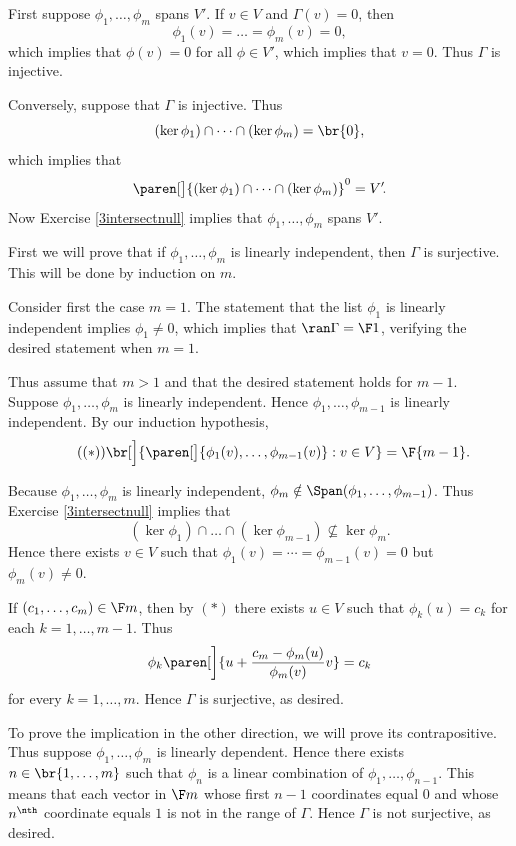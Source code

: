 \begin{Solution}
\begin{subtheorem}
\item
First suppose $\phi_1, \dots, \phi_m$ spans $V'\!$. If $v \in V$ and $\Gamma(v) = 0$, then
\[
\phi_1(v) = \dots = \phi_m(v) = 0,
\]
which implies that $\phi(v) = 0$ for all $\phi \in V'\!$, which implies that $v = 0$. Thus $\Gamma$ is injective.

Conversely, suppose that $\Gamma$ is injective. Thus
\[
(\ker \phi_1) \cap \cdots \cap (\ker \phi_m) = \br{0},
\]
which implies that
\[
\paren[\big]{ (\ker \phi_1) \cap \cdots \cap (\ker \phi_m) }^0 = V'\!.
\]
Now Exercise \ref{3intersectnull} implies that $\phi_1, \dots, \phi_m$ spans $V'\!$.

\item
First we will prove that if $\phi_1, \dots, \phi_m$ is linearly independent, then $\Gamma$ is surjective. This will be done by induction on $m$.

Consider first the case $m = 1$. The statement that the list $\phi_1$ is linearly independent implies $\phi_1 \ne 0$, which implies that $\ran \Gamma = \F1$, verifying the desired statement when $m = 1$.

Thus assume that $m>1$ and that the desired statement holds for $m-1$. Suppose $\phi_1, \dots, \phi_m$ is linearly independent. Hence $\phi_1, \dots, \phi_{m-1}$ is linearly independent. By our induction hypothesis,
\[ \tag{$(*)$}
\br[\Big]{ \paren[\big]{ \phi_1(v), \ldots, \phi_{m-1}(v) } : v \in V} = \F{m-1} .
\]

Because $\phi_1, \dots, \phi_m$ is linearly independent, $\phi_m \notin \Span(\phi_1, \ldots, \phi_{m-1})$. Thus Exercise \ref{3intersectnull} implies that
\[
(\ker \phi_1) \cap \dots \cap (\ker \phi_{m-1}) \nsubseteq \ker \phi_m.
\]
Hence there exists $v \in V$ such that $\phi_1(v) = \cdots = \phi_{m-1}(v) = 0$ but $\phi_m(v) \ne 0$.

If $(c_1, \ldots, c_m) \in \F m$, then by $(*)$ there exists $u \in V$ such that $\phi_k(u) = c_k$ for each $k = 1, \ldots, m-1$. Thus
\[
\phi_k\paren[\bigg]{u + \frac{c_m - \phi_m(u)}{\phi_m(v)}v} = c_k
\]
for every $k = 1, \ldots, m$. Hence $\Gamma$ is surjective, as desired.

To prove the implication in the other direction, we will prove its contrapositive. Thus suppose $\phi_1, \ldots, \phi_m$ is linearly dependent. Hence there exists $n \in \br{1, \ldots, m}$ such that $\phi_n$ is a linear combination of $\phi_1, \ldots, \phi_{n-1}$. This means that each vector in $\F m$ whose first $n-1$ coordinates equal $0$ and whose $n^\nth$ coordinate equals $1$ is not in the range of $\Gamma$. Hence $\Gamma$ is not surjective, as desired.
\end{subtheorem}
\end{Solution}

